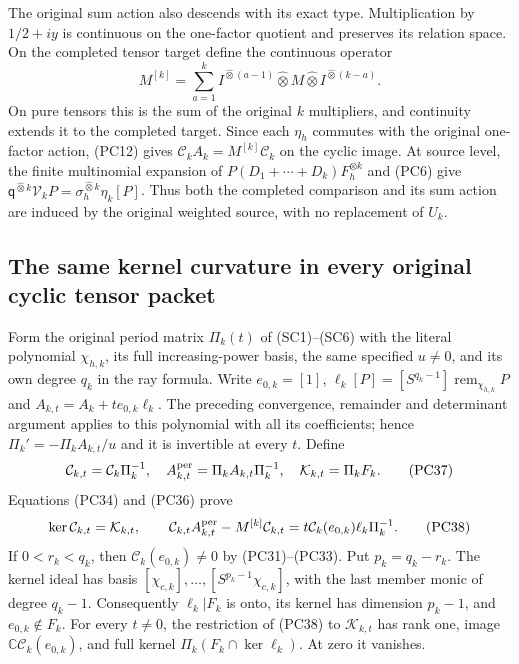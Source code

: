 The original sum action also descends with its exact type.  Multiplication
by $1/2+iy$ is continuous on the one-factor quotient and preserves its
relation space.  On the completed tensor target define the continuous
operator
\[
 M^{[k]}=\sum_{a=1}^k
       I^{\widehat\otimes(a-1)}\widehat\otimes M
                         \widehat\otimes I^{\widehat\otimes(k-a)}.
 \tag{PC36}
\]
On pure tensors this is the sum of the original $k$ multipliers,
and continuity extends it to the completed target.  Since each
$\eta_h$ commutes with the original one-factor action, (PC12)
gives $\mathcal C_kA_k=M^{[k]}\mathcal C_k$ on the cyclic image.
At source level, the finite multinomial expansion of
$P(D_1+\cdots+D_k)F_h^{\otimes k}$ and (PC6) give
$\mathsf q^{\widehat\otimes k}\mathcal V_kP
=\sigma_h^{\widehat\otimes k}\eta_k[P]$.
Thus both the completed comparison and its sum action are induced
by the original weighted source, with no replacement of $U_k$.

\subsection{The same kernel curvature in every original cyclic tensor packet}

Form the original period matrix $\Pi_k(t)$ of (SC1)--(SC6) with
the literal polynomial $\chi_{h,k}$, its full increasing-power basis,
the same specified $u\ne0$, and its own degree $q_k$ in the ray
formula.  Write $e_{0,k}=[1]$,
$\ell_k[P]=[S^{q_k-1}]\operatorname{rem}_{\chi_{h,k}}P$ and
$A_{k,t}=A_k+t e_{0,k}\ell_k$.  The preceding convergence,
remainder and determinant argument applies to this polynomial with
all its coefficients; hence $\Pi_k'=-\Pi_kA_{k,t}/u$ and it is
invertible at every $t$.  Define
\[
 \mathcal C_{k,t}=\mathcal C_k\Pi_k^{-1},\quad
 A_{k,t}^{\rm per}=\Pi_kA_{k,t}\Pi_k^{-1},\quad
 \mathcal K_{k,t}=\Pi_k F_k.
 \tag{PC37}
\]
Equations (PC34) and (PC36) prove
\[
 \ker\mathcal C_{k,t}=\mathcal K_{k,t},\qquad
 \mathcal C_{k,t}A_{k,t}^{\rm per}-M^{[k]}\mathcal C_{k,t}
       =t\mathcal C_k(e_{0,k})\ell_k\Pi_k^{-1}.
 \tag{PC38}
\]
If $0<r_k<q_k$, then $\mathcal C_k(e_{0,k})\ne0$ by
(PC31)--(PC33).  Put $p_k=q_k-r_k$.  The kernel ideal has basis
$[\chi_{c,k}],\ldots,[S^{p_k-1}\chi_{c,k}]$, with the last
member monic of degree $q_k-1$.  Consequently $\ell_k|F_k$ is
onto, its kernel has dimension $p_k-1$, and $e_{0,k}\notin F_k$.
For every $t\ne0$, the restriction of (PC38) to $\mathcal K_{k,t}$
has rank one, image $\mathbb C\mathcal C_k(e_{0,k})$, and full
kernel $\Pi_k(F_k\cap\ker\ell_k)$.  At zero it vanishes.

